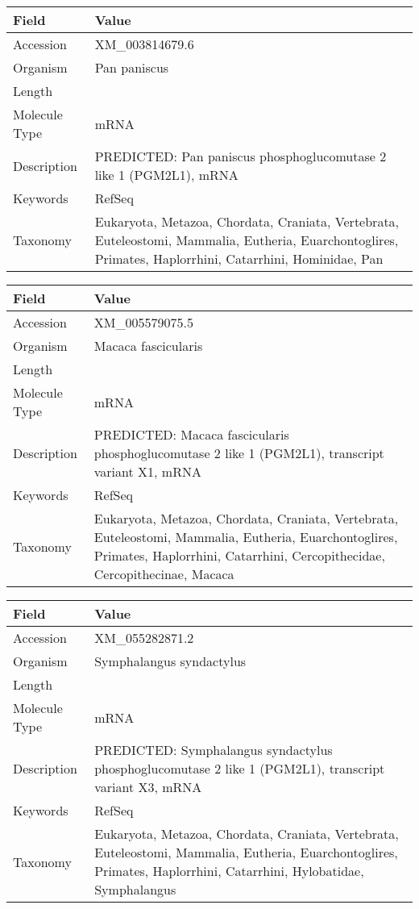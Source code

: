 \documentclass[10pt]{article}
\begin{document}
{\footnotesize
\begin{longtable}{>{\raggedright\arraybackslash}p{4.5cm} >{\raggedright\arraybackslash}p{11.5cm}}
\textbf{Field} & \textbf{Value} \\
\hline
Accession & XM\_003814679.6 \\
Organism & Pan paniscus \\
Length & 8778 \\
Molecule Type & mRNA \\
Description & PREDICTED: Pan paniscus phosphoglucomutase 2 like 1 (PGM2L1), mRNA \\
Keywords & RefSeq \\
Taxonomy & Eukaryota, Metazoa, Chordata, Craniata, Vertebrata, Euteleostomi, Mammalia, Eutheria, Euarchontoglires, Primates, Haplorrhini, Catarrhini, Hominidae, Pan \\
\end{longtable}
}

{\footnotesize
\begin{longtable}{>{\raggedright\arraybackslash}p{4.5cm} >{\raggedright\arraybackslash}p{11.5cm}}
\textbf{Field} & \textbf{Value} \\
\hline
Accession & XM\_005579075.5 \\
Organism & Macaca fascicularis \\
Length & 4277 \\
Molecule Type & mRNA \\
Description & PREDICTED: Macaca fascicularis phosphoglucomutase 2 like 1 (PGM2L1), transcript variant X1, mRNA \\
Keywords & RefSeq \\
Taxonomy & Eukaryota, Metazoa, Chordata, Craniata, Vertebrata, Euteleostomi, Mammalia, Eutheria, Euarchontoglires, Primates, Haplorrhini, Catarrhini, Cercopithecidae, Cercopithecinae, Macaca \\
\end{longtable}
}

{\footnotesize
\begin{longtable}{>{\raggedright\arraybackslash}p{4.5cm} >{\raggedright\arraybackslash}p{11.5cm}}
\textbf{Field} & \textbf{Value} \\
\hline
Accession & XM\_055282871.2 \\
Organism & Symphalangus syndactylus \\
Length & 8192 \\
Molecule Type & mRNA \\
Description & PREDICTED: Symphalangus syndactylus phosphoglucomutase 2 like 1 (PGM2L1), transcript variant X3, mRNA \\
Keywords & RefSeq \\
Taxonomy & Eukaryota, Metazoa, Chordata, Craniata, Vertebrata, Euteleostomi, Mammalia, Eutheria, Euarchontoglires, Primates, Haplorrhini, Catarrhini, Hylobatidae, Symphalangus \\
\end{longtable}
}
\end{document}
